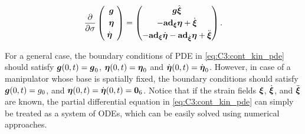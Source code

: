 %
\begin{equation}
\frac{\partial }{\partial \sigma} 
\begin{pmatrix}
\,{\boldsymbol{g}}\; \\[0.25em]
\,{\boldsymbol{\eta}}\; \\[0.25em]
\;\dot{{\boldsymbol{\eta}}}\;\;
\end{pmatrix}  = 
\begin{pmatrix}
{\boldsymbol{g}} \hat{{\boldsymbol{\xi}}} \\[0.25em]
-\textbf{ad}_{\boldsymbol{\xi}}\boldsymbol{\eta} + \dot{\boldsymbol{\xi}} \\[0.25em]
-\textbf{ad}_{\boldsymbol{\xi}}\dot{{\boldsymbol{\eta}}} -\textbf{ad}_{\dot{{\boldsymbol{\xi}}}}{\boldsymbol{\eta}}  + \ddot{\boldsymbol{\xi}}
\end{pmatrix}.
\label{eq:C3:cont_kin_pde}
\end{equation}

\noindent For a general case, the boundary conditions of PDE in \eqref{eq:C3:cont_kin_pde} should satisfy ${\boldsymbol{g}}(0,t) = {\boldsymbol{g}}_0$, ${\boldsymbol{\eta}}(0,t) = {\boldsymbol{\eta}}_0$ and $\dot{{\boldsymbol{\eta}}}(0,t) = \dot{{\boldsymbol{\eta}}}_0$. However, in case of a manipulator whose base is spatially fixed, the boundary conditions should satisfy ${\boldsymbol{g}}(0,t) = g_0$, and ${\boldsymbol{\eta}}(0,t) = \dot{{\boldsymbol{\eta}}}(0,t) = \boldsymbol{0}_6$. Notice that if the strain fields ${\boldsymbol{\xi}}$, $\dot{{\boldsymbol{\xi}}}$, and $\ddot{{\boldsymbol{\xi}}}$ are known, the partial differential equation in \eqref{eq:C3:cont_kin_pde} can simply be treated as a system of ODEs, which can be easily solved using numerical approaches.

